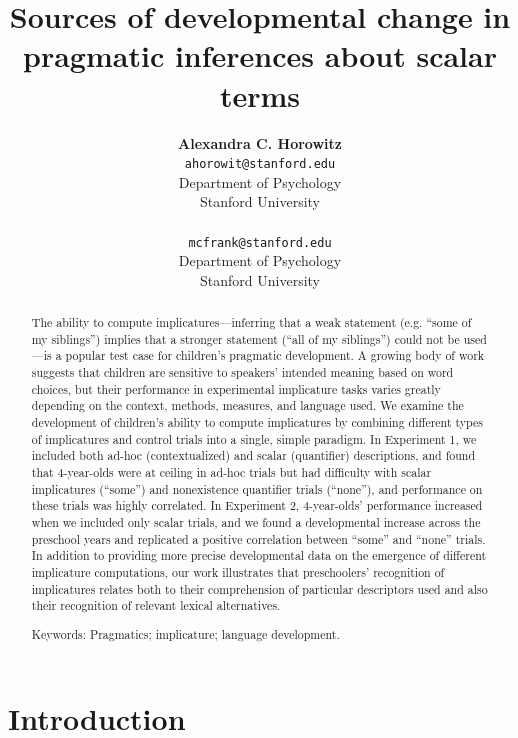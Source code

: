 \documentclass[10pt,letterpaper]{article}
\title{Sources of developmental change in pragmatic inferences about scalar terms}
\author{{\large \bf Alexandra C. Horowitz} \\ \texttt{ahorowit@stanford.edu}\\ Department of Psychology \\ Stanford University \\ 
\And {\large \bf Michael C. Frank} \\ \texttt{mcfrank@stanford.edu} \\ Department of Psychology \\ Stanford University \\ }
\begin{document}
\maketitle

\begin{abstract} 

The ability to compute implicatures---inferring that a weak statement (e.g. ``some of my siblings'') implies that a stronger statement (``all of my siblings'') could not be used---is a popular test case for children's pragmatic development. A growing body of work suggests that children are sensitive to speakers' intended meaning based on word choices, but their performance in experimental implicature tasks varies greatly depending on the context, methods, measures, and language used. We examine the development of children's ability to compute implicatures by combining different types of implicatures and control trials into a single, simple paradigm. In Experiment 1, we included both ad-hoc (contextualized) and scalar (quantifier) descriptions, and found that 4-year-olds were at ceiling in ad-hoc trials but had difficulty with scalar implicatures (``some'') and nonexistence quantifier trials (``none''), and performance on these trials was highly correlated.  In Experiment 2, 4-year-olds' performance increased when we included only scalar trials, and we found a developmental increase across the preschool years and replicated a positive correlation between ``some'' and ``none'' trials. In addition to providing more precise developmental data on the emergence of different implicature computations, our work illustrates that preschoolers' recognition of implicatures relates both to their comprehension of particular descriptors used and also their recognition of relevant lexical alternatives. 




{Keywords:} Pragmatics; implicature; language development. 
\end{abstract}

\section{Introduction}
\end{document}
